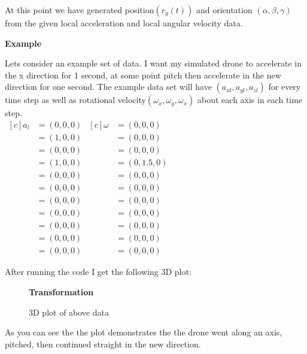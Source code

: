 \documentclass[12pt,letterpaper,boxed]{hmcpset}
\begin{document}
At this point we have generated position$(r_g(t))$ and orientation $(\alpha, \beta, \gamma)$ from the given local acceleration and local angular velocity data.\\

\begin{center}
\textbf{Example}
\end{center}
Lets consider an example set of data. I want my simulated drone to accelerate in the x direction for 1 second, at some point pitch then accelerate in the new direction for one second. The example data set will have $(a_{xl},a_{yl},a_{zl})$ for every time step as well as rotational velocity$(\omega_{x},\omega_{y},\omega_{x})$ about each axis in each time step.\\
\begin{math}
\begin{aligned}[c]
a_l &=(0,0,0)\\
&=(1,0,0) \\
&=(0,0,0) \\
&=(1,0,0) \\
&=(0,0,0) \\
&=(0,0,0) \\
&=(0,0,0) \\
&=(0,0,0) \\
&=(0,0,0) \\
&=(0,0,0) \\
&=(0,0,0) 
\end{aligned}
\begin{aligned}[c]
\omega &=(0,0,0) \\
&=(0,0,0) \\
&=(0,0,0) \\
&=(0,1.5,0) \\
&=(0,0,0) \\
&=(0,0,0) \\
&=(0,0,0) \\
&=(0,0,0) \\
&=(0,0,0) \\
&=(0,0,0) \\
&=(0,0,0) 
\end{aligned}
\end{math}

After running the code I get the following 3D plot:

\begin{figure}[H]
	\centering
	\textbf{Transformation}\par\medskip
	\caption{3D plot of above data}
	\label{fig:3D}
\end{figure}

As you can see the the plot demonstrates the the drone went along an axis, pitched, then continued straight in the new direction.
\end{document}
